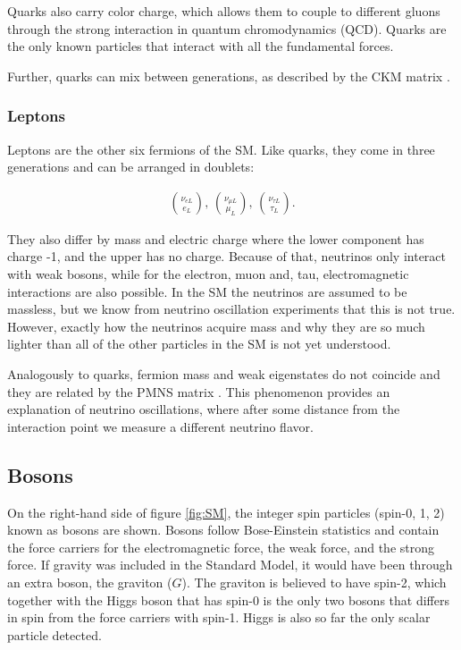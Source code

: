 Quarks also carry color charge, which allows them to couple to different gluons through the strong interaction in quantum chromodynamics (QCD). Quarks are the only known particles that interact with all the fundamental forces. 

Further, quarks can mix between generations, as described by the CKM matrix \cite{thomson}.





\subsubsection{Leptons}
Leptons are the other six fermions of the SM. Like quarks, they come in three generations and can be arranged in doublets:

\begin{align}
    \binom{\nu_{eL}}{e_L} \text{,  } \binom{\nu_{\mu L}}{\mu_L} \text{,  } \binom{\nu_{\tau L}}{\tau_L}.
\end{align}

They also differ by mass and electric charge where the lower component has charge -1, and the upper has no charge. Because of that, neutrinos only interact with weak bosons, while for the electron, muon and, tau, electromagnetic interactions are also possible. In the SM the neutrinos are assumed to be massless, but we know from neutrino oscillation experiments that this is not true. However, exactly how the neutrinos acquire mass and why they are so much lighter than all of the other particles in the SM is not yet understood. 

Analogously to quarks, fermion mass and weak eigenstates do not coincide and they are related by the PMNS matrix \cite{thomson}. This phenomenon provides an explanation of neutrino oscillations, where after some distance from the interaction point we measure a different neutrino flavor. 


\subsection{Bosons}
On the right-hand side of figure \ref{fig:SM}, the integer spin particles (spin-0, 1, 2) known as bosons are shown. Bosons follow Bose-Einstein statistics and contain the force carriers for the electromagnetic force, the weak force, and the strong force. If gravity was included in the Standard Model, it would have been through an extra boson, the graviton ($G$). The graviton is believed to have spin-2, which together with the Higgs boson that has spin-0 is the only two bosons that differs in spin from the force carriers with spin-1. Higgs is also so far the only scalar particle detected.



